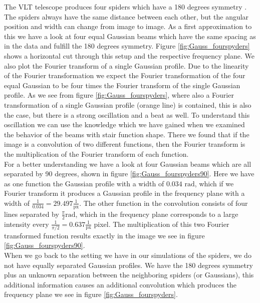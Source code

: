 The VLT telescope produces four spiders which have a 180 degrees symmetry \cite{ESOmanual}. The spiders always have the same distance between each other, but the angular position and width can change from image to image. As a first approximation to this we have a look at four equal Gaussian beams which have the same spacing as in the data and fulfill the 180 degrees symmetry. Figure \ref{fig:Gauss_fourspyders} shows a horizontal cut through this setup and the respective frequency plane. We also plot the Fourier transform of a single Gaussian profile. Due to the linearity of the Fourier transformation we expect the Fourier transformation of the four equal Gaussian to be four times the Fourier transform of the single Gaussian profile. As we see from figure \ref{fig:Gauss_fourspyders}, where also a Fourier transformation of a single Gaussian profile (orange line) is contained, this is also the case, but there is a strong oscillation and a beat as well. To understand this oscillation we can use the knowledge which we have gained when we examined the behavior of the beams with stair function shape. There we found that if the image is a convolution of two different functions, then the Fourier transform is the multiplication of the Fourier transform of each function. \\
For a better understanding we have a look at four Gaussian beams which are all separated by 90 degrees, shown in figure \ref{fig:Gauss_fourspyders90}. Here we have as one function the Gaussian profile with a width of $0.034$ $\mathrm{rad}$,  which if we Fourier transform it produces a Gaussian profile in the frequency plane with a width of $\frac{1}{0.034} = 29.497 \frac{1}{\mathrm{px}}$. The other function in the convolution consists of four lines separated by $\frac{\pi}{2} \mathrm{rad}$, which in the frequency plane corresponds to a large intensity every $\frac{1}{\pi/2} = 0.637 \frac{1}{\mathrm{px}}$ pixel. The multiplication of this two Fourier transformed function results exactly in the image we see in figure \ref{fig:Gauss_fourspyders90}. \\
When we go back to the setting we have in our simulations of the spiders, we do not have equally separated Gaussian profiles. We have the 180 degrees symmetry plus an unknown separation between the neighboring spiders (or Gaussians), this additional information causes an additional convolution which produces the frequency plane we see in figure \ref{fig:Gauss_fourspyders}. 
